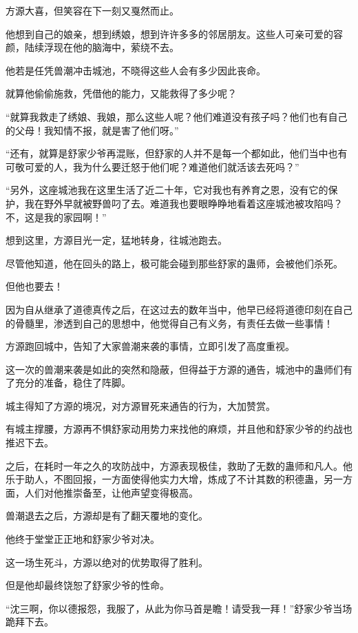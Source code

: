 \begin{this_body}
方源大喜，但笑容在下一刻又戛然而止。

他想到自己的娘亲，想到绣娘，想到许许多多的邻居朋友。这些人可亲可爱的容颜，陆续浮现在他的脑海中，萦绕不去。

他若是任凭兽潮冲击城池，不晓得这些人会有多少因此丧命。

就算他偷偷施救，凭借他的能力，又能救得了多少呢？

“就算我救走了绣娘、我娘，那么这些人呢？他们难道没有孩子吗？他们也有自己的父母！我知情不报，就是害了他们呀。”

“还有，就算是舒家少爷再混账，但舒家的人并不是每一个都如此，他们当中也有可敬可爱的人，我为什么要迁怒于他们呢？难道他们就活该去死吗？”

“另外，这座城池我在这里生活了近二十年，它对我也有养育之恩，没有它的保护，我在野外早就被野兽叼了去。难道我也要眼睁睁地看着这座城池被攻陷吗？不，这是我的家园啊！”

想到这里，方源目光一定，猛地转身，往城池跑去。

尽管他知道，他在回头的路上，极可能会碰到那些舒家的蛊师，会被他们杀死。

但他也要去！

因为自从继承了道德真传之后，在这过去的数年当中，他早已经将道德印刻在自己的骨髓里，渗透到自己的思想中，他觉得自己有义务，有责任去做一些事情！

方源跑回城中，告知了大家兽潮来袭的事情，立即引发了高度重视。

这一次的兽潮来袭是如此的突然和隐蔽，但得益于方源的通告，城池中的蛊师们有了充分的准备，稳住了阵脚。

城主得知了方源的境况，对方源冒死来通告的行为，大加赞赏。

有城主撑腰，方源再不惧舒家动用势力来找他的麻烦，并且他和舒家少爷的约战也推迟下去。

之后，在耗时一年之久的攻防战中，方源表现极佳，救助了无数的蛊师和凡人。他乐于助人，不图回报，一方面使得他实力大增，炼成了不计其数的积德蛊，另一方面，人们对他推崇备至，让他声望变得极高。

兽潮退去之后，方源却是有了翻天覆地的变化。

他终于堂堂正正地和舒家少爷对决。

这一场生死斗，方源以绝对的优势取得了胜利。

但是他却最终饶恕了舒家少爷的性命。

“沈三啊，你以德报怨，我服了，从此为你马首是瞻！请受我一拜！”舒家少爷当场跪拜下去。


\end{this_body}
